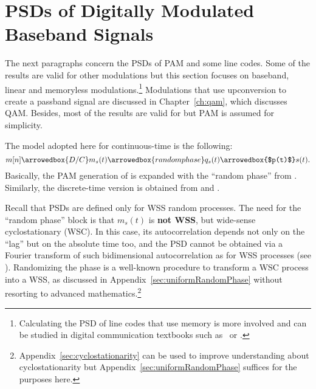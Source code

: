 \section{PSDs of Digitally Modulated Baseband Signals}
\label{sec:PSDsOfDigitalSignals}

The next paragraphs concern the PSDs of PAM and some line codes. Some of the results are valid
for other modulations but this section focuses on baseband, linear and memoryless modulations.\footnote{Calculating the PSD of line codes that use memory is more involved and can be studied in digital communication textbooks such as~\cite{Proakis07} or \cite{Peebles86}.} Modulations that use upconversion to create a passband signal are discussed in Chapter~\ref{ch:qam}, which discusses QAM.
Besides, most of the results are valid for 
but PAM is assumed for simplicity. 


The model adopted here for continuous-time is the following:
\begin{equation}
m[n] \arrowedbox{ D/C } m_s(t) \arrowedbox{random phase} q_s(t) \arrowedbox{$p(t)$} s(t).
\label{eq:forPSDCalculation}
\end{equation}
Basically, the PAM generation of  is expanded with the ``random phase'' from . Similarly, the discrete-time version is obtained from  and .

Recall that PSDs are
defined only for WSS random processes.
The need for the ``random phase'' block is that $m_s(t)$ is \textbf{not WSS}, but wide-sense cyclostationary (WSC). In this case, its autocorrelation depends not only on the ``lag'' but
on the absolute time too, and the PSD cannot be obtained via a Fourier transform of such bidimensional autocorrelation as for WSS processes (see ).
Randomizing the phase is a well-known procedure to transform a WSC process into a WSS, as discussed in Appendix~\ref{sec:uniformRandomPhase} without resorting to advanced mathematics.\footnote{Appendix~\ref{sec:cyclostationarity} can be used to improve understanding about cyclostationarity but Appendix~\ref{sec:uniformRandomPhase} suffices for the purposes here.}

